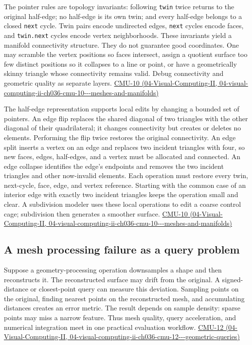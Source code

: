 The pointer rules are topology invariants: following \texttt{twin} twice returns to the original half-edge; no half-edge is its own twin; and every half-edge belongs to a closed \texttt{next} cycle. Twin pairs encode undirected edges, \texttt{next} cycles encode faces, and \texttt{twin.next} cycles encode vertex neighborhoods. These invariants yield a manifold connectivity structure. They do not guarantee good coordinates. One may scramble the vertex positions so faces intersect, assign a quotient surface too few distinct positions so it collapses to a line or point, or have a geometrically skinny triangle whose connectivity remains valid. Debug connectivity and geometric quality as separate layers. \href{../04-Visual-Computing-II/main.pdf\#nameddest=04-visual-computing-ii-ch036-cmu-10---meshes-and-manifolds}{CMU-10 (04-Visual-Computing-II, 04-visual-computing-ii-ch036-cmu-10-\/-\/-meshes-and-manifolds)}

The half-edge representation supports local edits by changing a bounded set of pointers. An edge flip replaces the shared diagonal of two triangles with the other diagonal of their quadrilateral; it changes connectivity but creates or deletes no elements. Performing the flip twice restores the original connectivity. An edge split inserts a vertex on an edge and replaces two incident triangles with four, so new faces, edges, half-edges, and a vertex must be allocated and connected. An edge collapse identifies the edge's endpoints and removes the two incident triangles and other now-invalid elements. Each operation must restore every twin, next-cycle, face, edge, and vertex reference. Starting with the common case of an interior edge with exactly two incident triangles keeps the operation small and clear. A subdivision modeler uses these local operations to edit a coarse control cage; subdivision then generates a smoother surface. \href{../04-Visual-Computing-II/main.pdf\#nameddest=04-visual-computing-ii-ch036-cmu-10---meshes-and-manifolds}{CMU-10 (04-Visual-Computing-II, 04-visual-computing-ii-ch036-cmu-10-\/-\/-meshes-and-manifolds)}

\subsection{A mesh processing failure as a query problem}\label{03-visual-computing-i-ch002-a-mesh-processing-failure-as-a-query-problem}

Suppose a geometry-processing operation downsamples a shape and then reconstructs it. The reconstructed surface may drift from the original. A signed-distance or closest-point query can measure this deviation. Sampling points on the original, finding nearest points on the reconstructed mesh, and accumulating distances creates an error metric. The result depends on sample density: sparse points may miss a narrow feature. Thus mesh quality, query acceleration, and numerical integration meet in one practical evaluation workflow. \href{../04-Visual-Computing-II/main.pdf\#nameddest=04-visual-computing-ii-ch036-cmu-12---geometric-queries}{CMU-12 (04-Visual-Computing-II, 04-visual-computing-ii-ch036-cmu-12-\/-\/-geometric-queries)}

